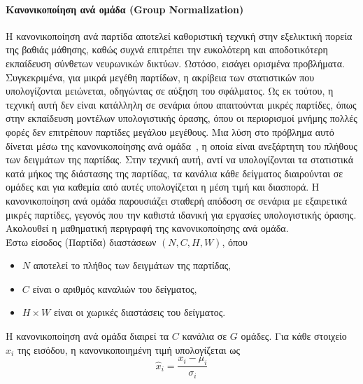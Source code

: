 \documentclass[12pt]{article}
\numberwithin{equation}{section}
\begin{document}
\paragraph{Κανονικοποίηση ανά ομάδα (Group Normalization) \\ [0.5cm]}

Η κανονικοποίηση ανά παρτίδα αποτελεί καθοριστική τεχνική στην εξελικτική πορεία της βαθιάς μάθησης, καθώς συχνά επιτρέπει την ευκολότερη και αποδοτικότερη εκπαίδευση σύνθετων νευρωνικών δικτύων. Ωστόσο, εισάγει ορισμένα προβλήματα. Συγκεκριμένα, για μικρά μεγέθη παρτίδων, η ακρίβεια των στατιστικών που υπολογίζονται μειώνεται, οδηγώντας σε αύξηση του σφάλματος. Ως εκ τούτου, η τεχνική αυτή δεν είναι κατάλληλη σε σενάρια όπου απαιτούνται μικρές παρτίδες, όπως στην εκπαίδευση μοντέλων υπολογιστικής όρασης, όπου οι περιορισμοί μνήμης πολλές φορές δεν επιτρέπουν παρτίδες μεγάλου μεγέθους. Μια λύση στο πρόβλημα αυτό δίνεται μέσω της κανονικοποίησης ανά ομάδα~\cite{wu2018groupnormalization}, η οποία είναι ανεξάρτητη του πλήθους των δειγμάτων της παρτίδας. Στην τεχνική αυτή, αντί να υπολογίζονται τα στατιστικά κατά μήκος της διάστασης της παρτίδας, τα κανάλια κάθε δείγματος διαιρούνται σε ομάδες και για καθεμία από αυτές υπολογίζεται η μέση τιμή και διασπορά. Η κανονικοποίηση ανά ομάδα παρουσιάζει σταθερή απόδοση σε σενάρια με εξαιρετικά μικρές παρτίδες, γεγονός που την καθιστά ιδανική για εργασίες υπολογιστικής όρασης. Ακολουθεί η μαθηματική περιγραφή της κανονικοποίησης ανά ομάδα. \\

\noindent Έστω είσοδος (Παρτίδα) διαστάσεων \((N, C, H, W)\), όπου\\

\begin{itemize}
  \item \(N\) αποτελεί το πλήθος των δειγμάτων της παρτίδας,
  \item \(C\) είναι ο αριθμός καναλιών του δείγματος,
  \item \(H \times W\) είναι οι χωρικές διαστάσεις του δείγματος.
\end{itemize}

\noindent Η κανονικοποίηση ανά ομάδα διαιρεί τα \(C\) κανάλια σε \(G\) ομάδες. Για κάθε στοιχείο \(x_i\) της εισόδου, η κανονικοποιημένη τιμή υπολογίζεται ως \\
\begin{equation}
\hat{x}_i = \frac{x_i - \mu_i}{\sigma_i}
\end{equation}\\
\end{document}
